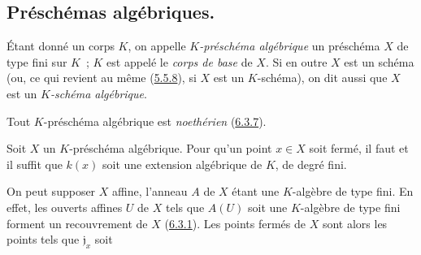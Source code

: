 \subsection{Préschémas algébriques.}
\label{subsection:I.6.4-fr}

\begin{definition}[6.4.1]
\label{I.6.4.1-fr}
Étant donné un corps $K$, on appelle \emph{$K$-préschéma algébrique} un
préschéma $X$ de type fini sur $K$~; $K$ est appelé le \emph{corps de base}
de $X$. Si en outre $X$ est un schéma (ou, ce qui revient au même
(\hyperref[I.5.5.8-fr]{5.5.8}), si $X$ est un $K$-schéma), on dit aussi que
$X$ est un \emph{$K$-schéma algébrique}.
\end{definition}

Tout $K$-préschéma algébrique est \emph{noethérien}
(\hyperref[I.6.3.7-fr]{6.3.7}).

\begin{proposition}[6.4.2]
\label{I.6.4.2-fr}
Soit $X$ un $K$-préschéma algébrique. Pour qu'un point $x\in X$ soit fermé,
il faut et il suffit que $k(x)$ soit une extension algébrique de $K$, de degré
fini.
\end{proposition}

On peut supposer $X$ affine, l'anneau $A$ de $X$ étant une $K$-algèbre de type
fini. En effet, les ouverts affines $U$ de $X$ tels que $A(U)$ soit une
$K$-algèbre de type fini forment un recouvrement de $X$
(\hyperref[I.6.3.1-fr]{6.3.1}). Les points fermés de $X$ sont alors les points
tels que $\mathfrak{j}_x$ soit
